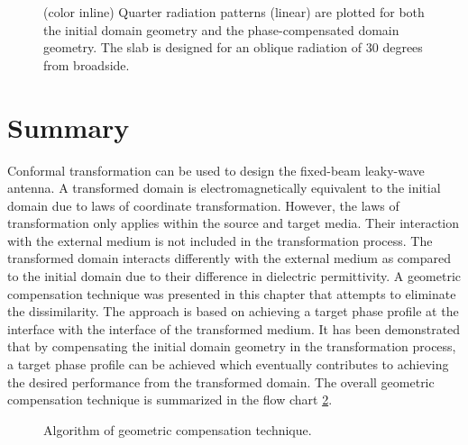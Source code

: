 \begin{figure} [t]
	\begin{center}
		
	\end{center}
  \caption[Comparison of the radiation patterns of the point source-fed substrates before and after applying the geometric compensation technique.]{(color inline) Quarter radiation patterns (linear) are plotted for both the initial domain geometry and the phase-compensated domain geometry. The slab is designed for an oblique radiation of 30 degrees from broadside.}
\label{fig:radpadAPS}
\end{figure}

\section{Summary}


Conformal transformation can be used to design the fixed-beam leaky-wave antenna. A transformed domain is electromagnetically equivalent to the initial domain due to laws of coordinate transformation. However, the laws of transformation only applies within the source and target media. Their interaction with the external medium is not included in the transformation process. The transformed domain interacts differently with the external medium as compared to the initial domain due to their difference in dielectric permittivity. A geometric compensation technique was presented in this chapter that attempts to eliminate the dissimilarity. The approach is based on achieving a target phase profile at the interface with the interface of the transformed medium. It has been demonstrated that by compensating the initial domain geometry in the transformation process, a target phase profile can be achieved which eventually contributes to achieving the desired performance from the transformed domain. The overall geometric compensation technique is summarized in the flow chart \ref{fig:flowchart}.
%
\begin{figure} [p]
 \begin{center}
 
\end{center}
\caption{Algorithm of geometric compensation technique.}
\label{fig:flowchart}
\end{figure}